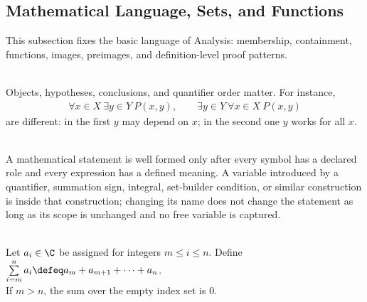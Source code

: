 \subsection{Mathematical Language, Sets, and Functions}

%


This subsection fixes the basic language of Analysis: membership, containment, functions, images, preimages, and definition-level proof patterns.

\begin{principle} \label{princ:analysis-language-as-structure} \\
Objects, hypotheses, conclusions, and quantifier order matter. For instance,
\begin{align}
\forall x\in X\ \exists y\in Y\ P(x,y), \qquad
\exists y\in Y\ \forall x\in X\ P(x,y) \nonumber
\end{align}
are different: in the first $y$ may depend on $x$; in the second one $y$ works for all $x$.
\end{principle}

\begin{principle} \label{princ:well-formed-statements-and-bound-variables} \\
A mathematical statement is well formed only after every symbol has a declared role and every expression has a defined meaning. A variable introduced by a quantifier, summation sign, integral, set-builder condition, or similar construction is  inside that construction; changing its name does not change the statement as long as its scope is unchanged and no free variable is captured.
\end{principle}

\begin{definition} \label{def:finite-sums-indexed-by-integers} \\
Let $a_i\in\C$ be assigned for integers $m\leq i\leq n$. Define $\sum\limits_{i=m}^{n}a_i\defeq a_m+a_{m+1}+\cdots+a_n$.\\
If $m>n$, the sum over the empty index set is $0$.
\end{definition}

